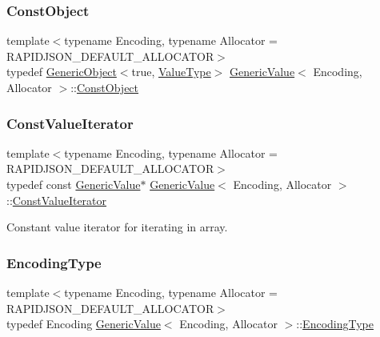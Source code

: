 \subsubsection{\texorpdfstring{Const\+Object}{ConstObject}}
{\footnotesize\ttfamily template$<$typename Encoding, typename Allocator = R\+A\+P\+I\+D\+J\+S\+O\+N\+\_\+\+D\+E\+F\+A\+U\+L\+T\+\_\+\+A\+L\+L\+O\+C\+A\+T\+OR$>$ \\
typedef \hyperlink{classGenericObject}{Generic\+Object}$<$true, \hyperlink{classGenericValue_a43a39bb4fca9b9d3de3da6ac353d25ce}{Value\+Type}$>$ \hyperlink{classGenericValue}{Generic\+Value}$<$ Encoding, Allocator $>$\+::\hyperlink{classGenericValue_a55ad310f5434e0e4a93df616b326ba7e}{Const\+Object}}

\mbox{\label{classGenericValue_a49010c6d6886f96ff0b0c51bccc7f6ea}} 
\subsubsection{\texorpdfstring{Const\+Value\+Iterator}{ConstValueIterator}}
{\footnotesize\ttfamily template$<$typename Encoding, typename Allocator = R\+A\+P\+I\+D\+J\+S\+O\+N\+\_\+\+D\+E\+F\+A\+U\+L\+T\+\_\+\+A\+L\+L\+O\+C\+A\+T\+OR$>$ \\
typedef const \hyperlink{classGenericValue}{Generic\+Value}$\ast$ \hyperlink{classGenericValue}{Generic\+Value}$<$ Encoding, Allocator $>$\+::\hyperlink{classGenericValue_a49010c6d6886f96ff0b0c51bccc7f6ea}{Const\+Value\+Iterator}}



Constant value iterator for iterating in array. 

\mbox{\label{classGenericValue_a28c2cb8d04d12566c1af37597a46d209}} 
\subsubsection{\texorpdfstring{Encoding\+Type}{EncodingType}}
{\footnotesize\ttfamily template$<$typename Encoding, typename Allocator = R\+A\+P\+I\+D\+J\+S\+O\+N\+\_\+\+D\+E\+F\+A\+U\+L\+T\+\_\+\+A\+L\+L\+O\+C\+A\+T\+OR$>$ \\
typedef Encoding \hyperlink{classGenericValue}{Generic\+Value}$<$ Encoding, Allocator $>$\+::\hyperlink{classGenericValue_a28c2cb8d04d12566c1af37597a46d209}{Encoding\+Type}}



